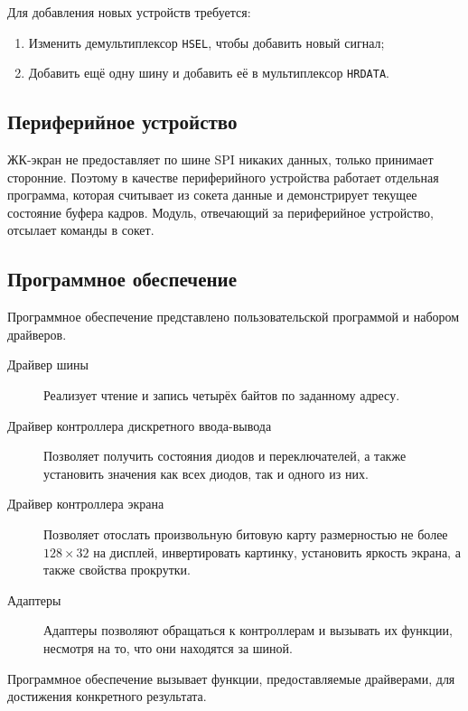 \documentclass[12pt, a4paper] {ncc}
\begin{document}
Для добавления новых устройств требуется:

\begin{enumerate}
        \item Изменить демультиплексор \texttt{HSEL}, чтобы добавить новый
                сигнал;
        \item Добавить ещё одну шину и добавить её в мультиплексор
                \texttt{HRDATA}.
\end{enumerate}

\subsection{Периферийное устройство}

ЖК-экран не предоставляет по шине SPI никаких данных, только принимает
сторонние. Поэтому в качестве периферийного устройства работает отдельная
программа, которая считывает из сокета данные и демонстрирует текущее состояние
буфера кадров. Модуль, отвечающий за периферийное устройство, отсылает команды
в сокет.

\subsection{Программное обеспечение}

Программное обеспечение представлено пользовательской программой и набором
драйверов.

\begin{description}
        \item[Драйвер шины] Реализует чтение и запись четырёх байтов по
                заданному адресу.
        \item[Драйвер контроллера дискретного ввода-вывода] Позволяет получить
                состояния диодов и переключателей, а также установить значения
                как всех диодов, так и одного из них.
        \item[Драйвер контроллера экрана] Позволяет отослать произвольную
                битовую карту размерностью не более $128 \times 32$ на дисплей,
                инвертировать картинку, установить яркость экрана, а также
                свойства прокрутки.
        \item[Адаптеры] Адаптеры позволяют обращаться к контроллерам и вызывать
                их функции, несмотря на то, что они находятся за шиной.
\end{description}

Программное обеспечение вызывает функции, предоставляемые драйверами, для
достижения конкретного результата.
\end{document}
